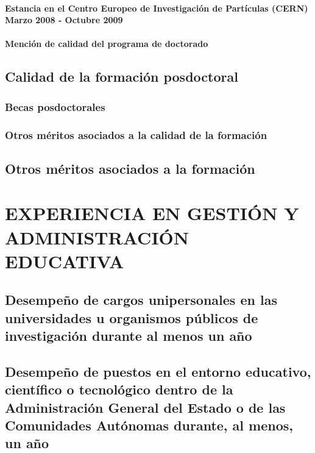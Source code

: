 \documentclass[a4paper, 11pt, twoside, openright]{report}
\begin{document}
\subsubsection{Estancia en el Centro Europeo de Investigación de Partículas (CERN) Marzo 2008 - Octubre 2009}


\subsubsection{Mención de calidad del programa de doctorado}


\section{Calidad de la formación posdoctoral}

\subsection{Becas posdoctorales}

\subsection{Otros méritos asociados a la calidad de la formación}

\section{Otros méritos asociados a la formación}
	

\chapter{EXPERIENCIA EN GESTIÓN Y ADMINISTRACIÓN EDUCATIVA}

\section{Desempeño de cargos unipersonales en las universidades u organismos públicos de investigación durante al menos un año}

\section{Desempeño de puestos en el entorno educativo, científico o tecnológico dentro de la Administración General del Estado o de las Comunidades Autónomas durante, al menos, un año}
\end{document}
